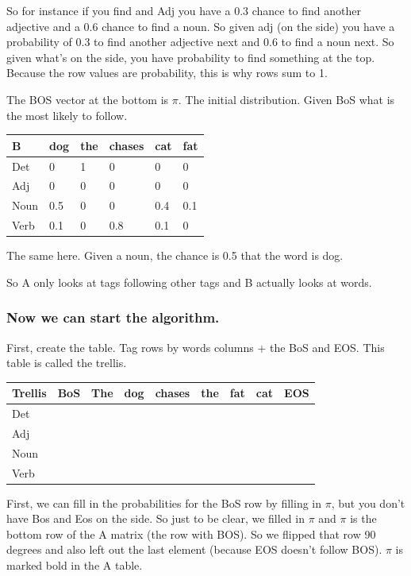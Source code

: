 \documentclass[
  11pt,
  british,
]{article}
\begin{document}
So for instance if you find and Adj you have a 0.3 chance to find
another adjective and a 0.6 chance to find a noun. So given adj (on the
side) you have a probability of 0.3 to find another adjective next and
0.6 to find a noun next. So given what's on the side, you have
probability to find something at the top. Because the row values are
probability, this is why rows sum to 1.

The BOS vector at the bottom is \(\pi\). The initial distribution. Given
BoS what is the most likely to follow.

\begin{longtable}[]{@{}llllll@{}}
\toprule
B & dog & the & chases & cat & fat \\
\midrule
\endhead
Det & 0 & 1 & 0 & 0 & 0 \\
Adj & 0 & 0 & 0 & 0 & 0 \\
Noun & 0.5 & 0 & 0 & 0.4 & 0.1 \\
Verb & 0.1 & 0 & 0.8 & 0.1 & 0 \\
\bottomrule
\end{longtable}

The same here. Given a noun, the chance is 0.5 that the word is dog.

So A only looks at tags following other tags and B actually looks at
words.

\hypertarget{now-we-can-start-the-algorithm.}{%
\subsubsection{Now we can start the
algorithm.}\label{now-we-can-start-the-algorithm.}}

First, create the table. \textbar Tag\textbar{} rows by
\textbar words\textbar{} columns + the BoS and EOS\textbar. This table
is called the trellis.

\begin{longtable}[]{@{}lllllllll@{}}
\toprule
Trellis & BoS & The & dog & chases & the & fat & cat & EOS \\
\midrule
\endhead
Det & & & & & & & & \\
Adj & & & & & & & & \\
Noun & & & & & & & & \\
Verb & & & & & & & & \\
\bottomrule
\end{longtable}

First, we can fill in the probabilities for the BoS row by filling in
\(\pi\), but you don't have Bos and Eos on the side. So just to be
clear, we filled in \(\pi\) and \(\pi\) is the bottom row of the A
matrix (the row with BOS). So we flipped that row 90 degrees and also
left out the last element (because EOS doesn't follow BOS). \(\pi\) is
marked bold in the A table.
\end{document}
